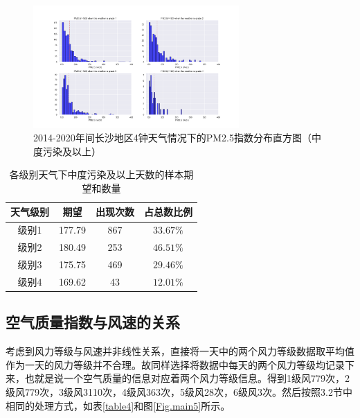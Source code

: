 \documentclass[UTF8,a4paper,10pt]{article}
\begin{document}
\begin{figure}[H] %
\centering %
\includegraphics[width=0.7\textwidth]{fig//pm25-weather-serious.png} %
\caption{2014-2020年间长沙地区4钟天气情况下的PM2.5指数分布直方图（中度污染及以上）} %
\label{Fig.main4} %
\end{figure}

\begin{table}[]
    \caption{各级别天气下中度污染及以上天数的样本期望和数量}
    \vspace{20pt}
    \centering
    \begin{tabular}{cccc}
        \toprule  %
        天气级别& 期望& 出现次数& 占总数比例\\
        \midrule  %
        级别1& 177.79& 867& $33.67\%$ \\
        级别2& 180.49& 253& $46.51\%$ \\
        级别3& 175.75& 469& $29.46\%$ \\
        级别4& 169.62& 43& $12.01\%$ \\
        \bottomrule %
    \end{tabular}
    \label{table3}
\end{table}

\subsection{空气质量指数与风速的关系}

\indent 考虑到风力等级与风速并非线性关系，直接将一天中的两个风力等级数据取平均值作为一天的风力等级并不合理。故同样选择将数据中每天的两个风力等级均记录下来，也就是说一个空气质量的信息对应着两个风力等级信息。得到1级风779次，2级风779次，3级风3110次，4级风363次，5级风28次，6级风3次。然后按照3.2节中相同的处理方式，如表\ref{table4}和图\ref{Fig.main5}所示。
\end{document}
